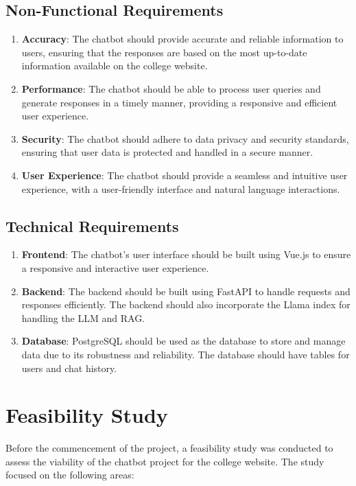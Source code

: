 \subsection{Non-Functional Requirements}
\begin{enumerate}
  \item \textbf{Accuracy}: The chatbot should provide accurate and reliable information to users, ensuring that the responses are based on the most up-to-date information available on the college website.
  \item \textbf{Performance}: The chatbot should be able to process user queries and generate responses in a timely manner, providing a responsive and efficient user experience.
  \item \textbf{Security}: The chatbot should adhere to data privacy and security standards, ensuring that user data is protected and handled in a secure manner.
  \item \textbf{User Experience}: The chatbot should provide a seamless and intuitive user experience, with a user-friendly interface and natural language interactions.
\end{enumerate}
\subsection{Technical Requirements}
\begin{enumerate}
  \item \textbf{Frontend}: The chatbot's user interface should be built using Vue.js to ensure a responsive and interactive user experience.
  \item \textbf{Backend}: The backend should be built using FastAPI to handle requests and responses efficiently. The backend should also incorporate the Llama index for handling the LLM and RAG\@.
  \item \textbf{Database}: PostgreSQL should be used as the database to store and manage data due to its robustness and reliability. The database should have tables for users and chat history.
\end{enumerate}
\section{Feasibility Study}
Before the commencement of the project, a feasibility study was conducted to assess the viability of the chatbot project for the college website. The study focused on the following areas:
